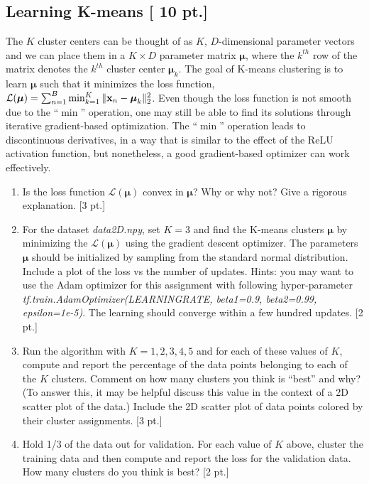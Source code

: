 \documentclass[12pt,letterpaper]{article}
\begin{document}
\subsection{Learning K-means [{\color{red} 10 pt.}]}

The $K$ cluster centers can be thought of as $K$, $D$-dimensional parameter vectors and we can place them in a $K \times D$ parameter matrix $\boldsymbol{\mu}$, where the $k^{th}$ row of the matrix denotes the $k^{th}$ cluster center $\boldsymbol{\mu}_k$. The goal of K-means clustering is to learn $\boldsymbol{\mu}$ such that it minimizes the loss function, $\mathcal{L}(\boldsymbol{\mu}) = \sum_{n=1}^B \min_{k=1}^K \|\bold{x}_n - \boldsymbol{\mu}_k\|_2^2$. Even though the loss function is not smooth due to the ``$\min$'' operation, one may still be able to find its solutions through iterative gradient-based optimization. The ``$\min$'' operation leads to discontinuous derivatives, in a way that is similar to the effect of the ReLU activation function, but nonetheless, a good gradient-based optimizer can work effectively.   

\begin{enumerate}
\item Is the loss function $\mathcal{L}(\boldsymbol{\mu})$ convex in $\boldsymbol{\mu}$? Why or why not? Give a rigorous explanation. [3 pt.] 
\item For the dataset \textit{data2D.npy}, set $K=3$ and find the K-means clusters $\boldsymbol{\mu}$ by minimizing the $\mathcal{L}(\boldsymbol{\mu})$ using the gradient descent optimizer. The parameters $\boldsymbol{\mu}$ should be initialized by sampling from the standard normal distribution. Include a plot of the loss vs the number of updates. Hints: you may want to use the Adam optimizer for this assignment with following hyper-parameter \textit{tf.train.AdamOptimizer(LEARNINGRATE, beta1=0.9, beta2=0.99, epsilon=1e-5)}. The learning should converge within a few hundred updates. [2 pt.] 



\item Run the algorithm with $K={1,2,3,4,5}$ and for each of these values of $K$, compute and report the percentage of the data points belonging to each of the $K$ clusters. Comment on how many clusters you think is ``best'' and why? (To answer this, it may be helpful discuss this value in the context of a 2D scatter plot of the data.) Include the 2D scatter plot of data points colored by their cluster assignments. [3 pt.] 
\item Hold 1/3 of the data out for validation. For each value of $K$ above, cluster the training data and then compute and report the loss for the validation data. How many clusters do you think is best? [2 pt.]
\end{enumerate}
\end{document}
